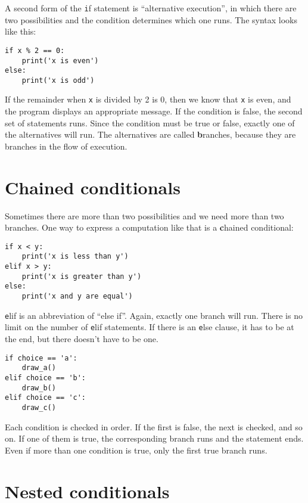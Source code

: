 \documentclass[
DIV=11,
fontsize=12,
twoside,
headinclude=false,
titlepage=firstiscover,
abstract=true,
headsepline=true,
footsepline=true,
chapterprefix=true, %
headings=big,
bibliography=totoc,%
captions=tableheading
]{scrbook}
\theoremstyle{definition}
\begin{document}
A second form of the {\texttt if} statement is ``alternative execution'',
in which there are two possibilities and the condition determines
which one runs.  The syntax looks like this:

\begin{lstlisting}
if x % 2 == 0:
    print('x is even')
else:
    print('x is odd')
\end{lstlisting}
%
If the remainder when {\texttt x} is divided by 2 is 0, then we know that
{\texttt x} is even, and the program displays an appropriate message.  If
the condition is false, the second set of statements runs.
Since the condition must be true or false, exactly one of the
alternatives will run.  The alternatives are called {\textbf
  branches}, because they are branches in the flow of execution.



\section{Chained conditionals}

Sometimes there are more than two possibilities and we need more than
two branches.  One way to express a computation like that is a {\textbf
chained conditional}:

\begin{lstlisting}
if x < y:
    print('x is less than y')
elif x > y:
    print('x is greater than y')
else:
    print('x and y are equal')
\end{lstlisting}
%
{\texttt elif} is an abbreviation of ``else if''.  Again, exactly one
branch will run.  There is no limit on the number of {\texttt
elif} statements.  If there is an {\texttt else} clause, it has to be
at the end, but there doesn't have to be one.

\begin{lstlisting}
if choice == 'a':
    draw_a()
elif choice == 'b':
    draw_b()
elif choice == 'c':
    draw_c()
\end{lstlisting}
%
Each condition is checked in order.  If the first is false,
the next is checked, and so on.  If one of them is
true, the corresponding branch runs and the statement
ends.  Even if more than one condition is true, only the
first true branch runs.  


\section{Nested conditionals}
\end{document}
